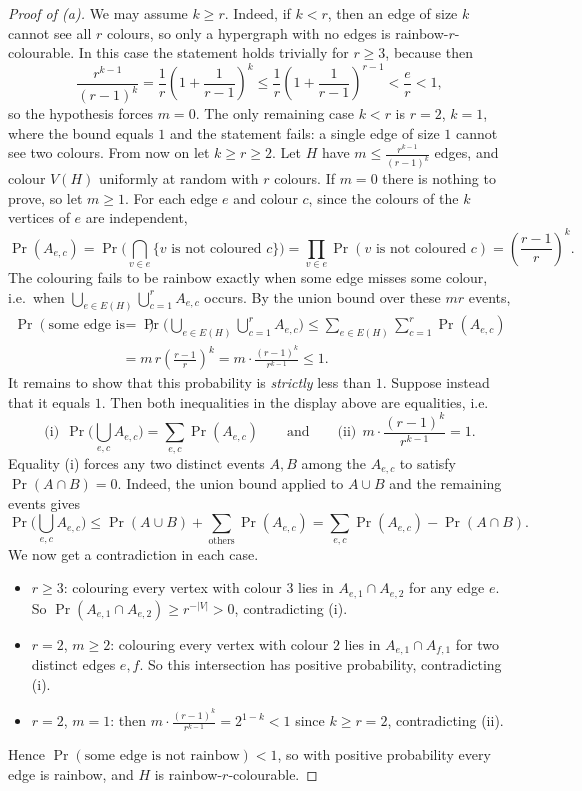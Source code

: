 \documentclass[a4paper,12pt]{article}
\begin{document}
\begin{proof}[Proof of (a)]
	We may assume $k \ge r$. Indeed, if $k < r$, then an edge of size $k$ cannot see all $r$ colours, so only a hypergraph with no edges is rainbow-$r$-colourable. In this case the statement holds trivially for $r \ge 3$, because then
	\[
		\frac{r^{k-1}}{(r-1)^k} = \frac1r \left( 1 + \frac{1}{r-1} \right)^k \le \frac1r \left( 1 + \frac{1}{r-1} \right)^{r-1} < \frac{e}{r} < 1,
	\]
	so the hypothesis forces $m = 0$. The only remaining case $k < r$ is $r = 2$, $k = 1$, where the bound equals $1$ and the statement fails: a single edge of size $1$ cannot see two colours. From now on let $k \ge r \ge 2$. Let $H$ have $m \le \frac{r^{k-1}}{(r-1)^k}$ edges, and colour $V(H)$ uniformly at random with $r$ colours. If $m = 0$ there is nothing to prove, so let $m \ge 1$. For each edge $e$ and colour $c$,
	since the colours of the $k$ vertices of $e$ are independent,
	\[
		\Pr(A_{e,c}) = \Pr\Big( \bigcap_{v \in e} \{ \text{$v$ is not coloured $c$} \} \Big) = \prod_{v \in e} \Pr(\text{$v$ is not coloured $c$}) = \left( \frac{r-1}{r} \right)^k.
	\]
	The colouring fails to be rainbow exactly when some edge misses some colour, i.e.\ when $\bigcup_{e \in E(H)} \bigcup_{c=1}^{r} A_{e,c}$ occurs. By the union bound over these $mr$ events,
	\begin{align*}
		\Pr(\text{some edge is not rainbow}) &= \Pr\Big( \bigcup_{e \in E(H)} \bigcup_{c=1}^{r} A_{e,c} \Big) \le \sum_{e \in E(H)} \sum_{c=1}^{r} \Pr(A_{e,c}) \\
		&= m\, r \left( \frac{r-1}{r} \right)^k = m \cdot \frac{(r-1)^k}{r^{k-1}} \le 1.
	\end{align*}
	It remains to show that this probability is \emph{strictly} less than $1$. Suppose instead that it equals $1$. Then both inequalities in the display above are equalities, i.e.
	\[
		\text{(i)} \ \ \Pr\Big( \bigcup_{e, c} A_{e,c} \Big) = \sum_{e, c} \Pr(A_{e,c}) \qquad \text{and} \qquad \text{(ii)} \ \ m \cdot \frac{(r-1)^k}{r^{k-1}} = 1.
	\]
	Equality (i) forces any two distinct events $A, B$ among the $A_{e,c}$ to satisfy $\Pr(A \cap B) = 0$. Indeed, the union bound applied to $A \cup B$ and the remaining events gives
	\[
		\Pr\Big( \bigcup_{e,c} A_{e,c} \Big) \le \Pr(A \cup B) + \sum_{\text{others}} \Pr(A_{e,c}) = \sum_{e,c} \Pr(A_{e,c}) - \Pr(A \cap B).
	\]
	We now get a contradiction in each case.
	\begin{itemize}
		\item $r \ge 3$: colouring every vertex with colour $3$ lies in $A_{e,1} \cap A_{e,2}$ for any edge $e$. So $\Pr(A_{e,1} \cap A_{e,2}) \ge r^{-|V|} > 0$, contradicting (i).
		\item $r = 2$, $m \ge 2$: colouring every vertex with colour $2$ lies in $A_{e,1} \cap A_{f,1}$ for two distinct edges $e, f$. So this intersection has positive probability, contradicting (i).
		\item $r = 2$, $m = 1$: then $m \cdot \frac{(r-1)^k}{r^{k-1}} = 2^{1-k} < 1$ since $k \ge r = 2$, contradicting (ii).
	\end{itemize}
	Hence $\Pr(\text{some edge is not rainbow}) < 1$, so with positive probability every edge is rainbow, and $H$ is rainbow-$r$-colourable.
\end{proof}
\end{document}

